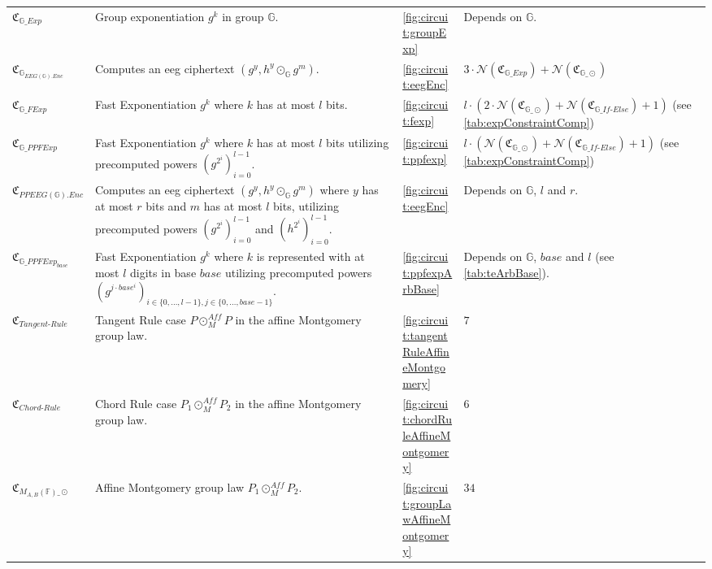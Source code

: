\begin{longtable}{|L{4cm}|L{5.5cm}|L{1.3cm}|L{3cm}|}
    $\mathfrak{C}_{\mathbb{G}\_Exp}$ & Group exponentiation $g^k$ in group $\mathbb{G}$. & \cref{fig:circuit:groupExp} & Depends on $\mathbb{G}$.\\
    $\mathfrak{C}_{\mathbb{G}_{EEG(\mathbb{G}).Enc}}$ & Computes an \gls{eeg} ciphertext $(g^y, h^y\odot_{\mathbb{G}}g^m)$. & \cref{fig:circuit:eegEnc} & $3\cdot \mathcal{N}(\mathfrak{C}_{\mathbb{G}\_Exp}) + \mathcal{N}(\mathfrak{C}_{\mathbb{G}\_\odot})$\\
    $\mathfrak{C}_{\mathbb{G}\_FExp}$ & Fast Exponentiation $g^k$ where $k$ has at most $l$ bits. & \cref{fig:circuit:fexp} & $l\cdot (2\cdot \mathcal{N}(\mathfrak{C}_{\mathbb{G}\_\odot}) + \mathcal{N}(\mathfrak{C}_{\mathbb{G}\_If\text{-}Else}) + 1)$ (see \cref{tab:expConstraintComp})\\
    $\mathfrak{C}_{\mathbb{G}\_PPFExp}$ & Fast Exponentiation $g^k$ where $k$ has at most $l$ bits utilizing precomputed powers $\left(g^{2^i}\right)_{i=0}^{l-1}$. & \cref{fig:circuit:ppfexp} & $l\cdot (\mathcal{N}(\mathfrak{C}_{\mathbb{G}\_\odot}) + \mathcal{N}(\mathfrak{C}_{\mathbb{G}\_If\text{-}Else}) + 1)$ (see \cref{tab:expConstraintComp})\\
    $\mathfrak{C}_{{PPEEG(\mathbb{G}).Enc}}$ & Computes an \gls{eeg} ciphertext $(g^y, h^y\odot_{\mathbb{G}}g^m)$ where $y$ has at most $r$ bits and $m$ has at most $l$ bits, utilizing precomputed powers $\left(g^{2^i}\right)_{i=0}^{l-1}$ and $\left(h^{2^i}\right)_{i=0}^{l-1}$. & \cref{fig:circuit:eegEnc} & Depends on $\mathbb{G}$, $l$ and $r$.\\
    $\mathfrak{C}_{\mathbb{G}\_PPFExp_{base}}$ & Fast Exponentiation $g^k$ where $k$ is represented with at most $l$ digits in base $base$ utilizing precomputed powers $\left(g^{j\cdot base^i}\right)_{i\in\{0,\dots, l-1\},j\in\{0,\dots, base-1\}}$. & \cref{fig:circuit:ppfexpArbBase} & Depends on $\mathbb{G}$, $base$ and $l$ (see \cref{tab:teArbBase}).\\
    \hline
    $\mathfrak{C}_{Tangent\text{-}Rule}$ & Tangent Rule case $P\odot_M^{Aff} P$ in the affine Montgomery group law. & \cref{fig:circuit:tangentRuleAffineMontgomery} & $7$\\
    $\mathfrak{C}_{Chord\text{-}Rule}$ & Chord Rule case $P_1\odot_M^{Aff} P_2$ in the affine Montgomery group law. & \cref{fig:circuit:chordRuleAffineMontgomery} & $6$\\
    $\mathfrak{C}_{M_{A,B}(\mathbb{F})\_\odot}$ & Affine Montgomery group law $P_1\odot_M^{Aff} P_2$. & \cref{fig:circuit:groupLawAffineMontgomery} & $34$ \\

\end{longtable}
